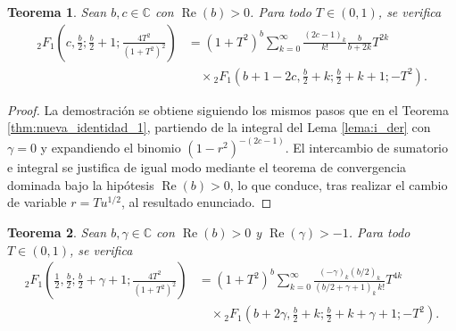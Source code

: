 \documentclass[12pt,a4paper]{book}
\newtheorem{theorem}{Teorema}
\begin{document}
\begin{theorem}
\label{thm:nueva_identidad_2}
Sean $b, c \in \mathbb{C}$ con $\operatorname{Re}(b) > 0$. Para todo $T \in (0, 1)$, se verifica
\begin{align*}
    {}_{2}F_{1}\left(c, \frac{b}{2}; \frac{b}{2}+1; \frac{4T^2}{(1+T^2)^2}\right) &= (1+T^2)^b \sum_{k=0}^{\infty} \frac{ (2c-1)_k }{k!}\frac{b}{b+2k} T^{2k} \\
    &\quad \times {}_{2}F_{1}\left(b+1-2c, \frac{b}{2}+k; \frac{b}{2}+k+1; -T^2\right).
\end{align*}
\end{theorem}

\begin{proof}
La demostración se obtiene siguiendo los mismos pasos que en el Teorema \ref{thm:nueva_identidad_1}, partiendo de la integral del Lema \ref{lema:i_der} con $\gamma = 0$ y expandiendo el binomio $(1-r^2)^{-(2c-1)}$. El intercambio de sumatorio e integral se justifica de igual modo mediante el teorema de convergencia dominada bajo la hipótesis $\operatorname{Re}(b) > 0$, lo que conduce, tras realizar el cambio de variable $r = T u^{1/2}$, al resultado enunciado.
\end{proof}

\begin{theorem}
\label{thm:nueva_identidad_3}
Sean $b, \gamma \in \mathbb{C}$ con $\operatorname{Re}(b) > 0$ y $\operatorname{Re}(\gamma) > -1$. Para todo $T \in (0, 1)$, se verifica
\begin{align*}
    {}_{2}F_{1}\left(\frac{1}{2}, \frac{b}{2}; \frac{b}{2}+\gamma+1; \frac{4T^2}{(1+T^2)^2}\right) &= (1+T^2)^b \sum_{k=0}^{\infty} \frac{(-\gamma)_k (b/2)_k}{(b/2+\gamma+1)_k \, k!} T^{4k} \\
    &\quad \times {}_{2}F_{1}\left(b+2\gamma, \frac{b}{2}+k; \frac{b}{2}+k+\gamma+1; -T^2\right).
\end{align*}
\end{theorem}
\end{document}
